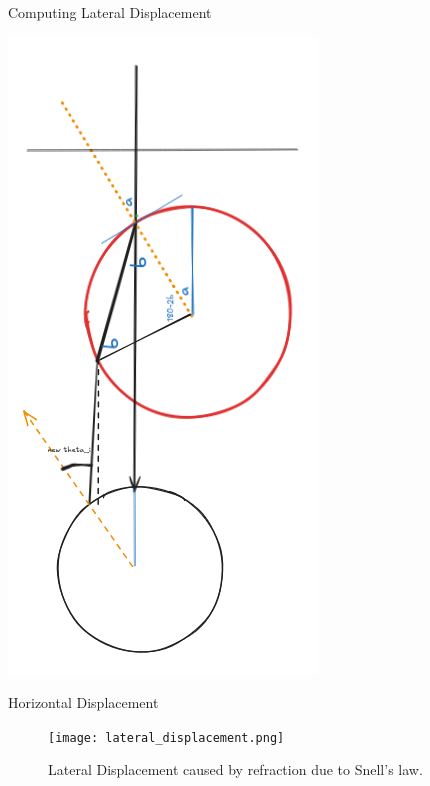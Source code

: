 \documentclass[aspectratio=169,xcolor=dvipsnames]{beamer}
\begin{document}
\begin{frame}{Computing Lateral Displacement}
\begin{minipage}{0.2\textwidth}
  \includegraphics[width=\linewidth]{incidenceangle.png}
\end{minipage}
\end{frame}
\begin{frame}{Horizontal Displacement}
      \begin{figure}[h!]
    \centering
    \texttt{[image: lateral\_displacement.png]}
    \caption{Lateral Displacement caused by refraction due to Snell's law.}
  \end{figure}
\end{frame}
\end{document}
